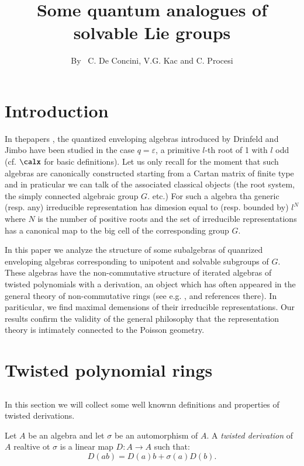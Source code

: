 \title{Some quantum analogues of solvable Lie groups}

\author{By~ C. De Concini, V.G. Kac and C. Procesi}

\date{}
\maketitle

\section*{Introduction}
In the\pageoriginale papers \cite[DK]{art4-key1-2}, \cite[DKP]{art4-key1-2} the quantized enveloping algebras introduced by Drinfeld and Jimbo have been studied in the case $q=\varepsilon$, a primitive $l$-th root of 1 with $l$ odd (cf. $\calx$ for basic definitions). Let us only recall for the moment that such algebras are canonically constructed starting from a Cartan matrix of finite type and in praticular we can talk of the associated classical objects (the root system, the simply connected algebraic group $G$. etc.) For such a algebra tha generic (resp. any) irreducible representation has dimesion equal to (resp. bounded by) $l^{N}$ where $N$ is the number of positive roots and the set of irreducible representations has a canonical map to the big cell of the corresponding group $G$.

In this paper we analyze the structure of some subalgebras of quanrized enveloping algebras corresponding to unipotent and solvable subgroups of $G$. These algebras have the non-commutative structure of iterated algebras of twisted polynomials with a derivation, an object which has often appeared in the general theory of non-commutative rings (see e.g. \cite{art4-keyKP}, \cite{art4-keyGL} and references there). In  pariticular, we find maximal demensions of their irreducible representations. Our results confirm the validity of the general philosophy that the representation theory is intimately connected to the Poisson geometry.

\section{Twisted polynomial rings}

\subsection{}
In this section we will collect some well knownn definitions and properties of twisted derivations.

Let $A$ be an algebra and let $\sigma$ be an automorphism of $A$. A \textit{twisted derivation} of $A$ realtive ot $\sigma$ is a linear map $D:A\rightarrow A$ such that:
$$
D(ab)=D(a)b+ \sigma(a)D(b).
$$
